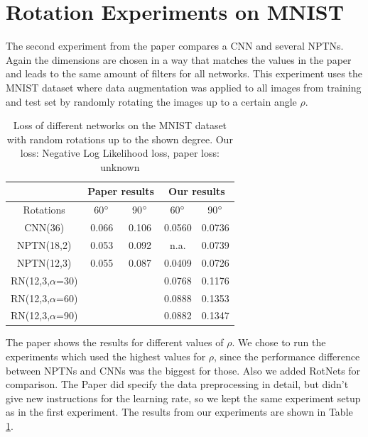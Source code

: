 \documentclass{llncs}
\begin{document}
\section{Rotation Experiments on MNIST}
The second experiment from the paper compares a CNN and several NPTNs. Again the dimensions are chosen in a way that matches the values in the paper and leads to the same amount of filters for all networks. 
This experiment uses the MNIST dataset \cite{MNIST} where data augmentation was applied to all images from training and test set by randomly rotating the images up to a certain angle $\rho$. 
\begin{table}
\begin{center}
\begin{tabular}{ |c| c c || c c| } 
 \hline 
  & \multicolumn{2}{|c||}{Paper results} & \multicolumn{2}{|c|}{Our results} \\
 \hline
 Rotations & \hspace{1mm} 60$\degree$ \hspace{1mm} & \hspace{1mm} 90$\degree$  & \hspace{1mm} 60$\degree$ \hspace{2mm} & \hspace{2mm}90$\degree$ \hspace{1mm} \\
 \hline
 CNN(36) & 0.066 & 0.106 & 0.0560 &  0.0736 \\ 
 NPTN(18,2) & 0.053 & 0.092  & n.a. & 0.0739\\ 
 NPTN(12,3) & 0.055 & 0.087 & 0.0409 &  0.0726\\
 \hline
RN(12,3,$\alpha$=30) & & &  0.0768 & 0.1176 \\
RN(12,3,$\alpha$=60) & & & 0.0888 & 0.1353 \\
RN(12,3,$\alpha$=90) & & & 0.0882 & 0.1347 \\

\hline

\end{tabular}

 \caption{Loss of different networks on the MNIST dataset with random rotations up to the shown degree. Our loss: Negative Log Likelihood loss, paper loss: unknown}
\end{center}
\label{tab:resultsexp2}
\end{table}
The paper shows the results for different values of $\rho$. We chose to run the experiments which used the highest values for $\rho$, since the performance difference between NPTNs and CNNs was the biggest for those. Also we added RotNets for comparison.
The Paper did specify the data preprocessing in detail, but didn't give new instructions for the learning rate, so we kept the same experiment setup as in the first experiment.
The results from our experiments are shown in Table \ref{tab:resultsexp2}. 
\end{document}
